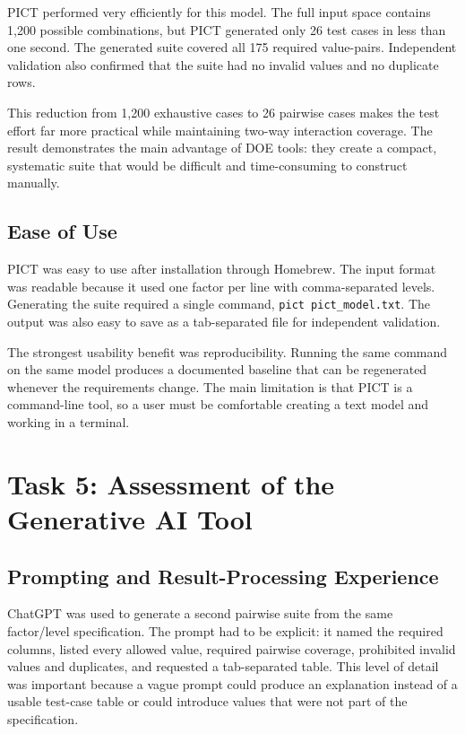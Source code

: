 \documentclass[11pt]{article}
\begin{document}
PICT performed very efficiently for this model. The full input space contains 1,200 possible combinations, but PICT generated only 26 test cases in less than one second. The generated suite covered all 175 required value-pairs. Independent validation also confirmed that the suite had no invalid values and no duplicate rows.

This reduction from 1,200 exhaustive cases to 26 pairwise cases makes the test effort far more practical while maintaining two-way interaction coverage. The result demonstrates the main advantage of DOE tools: they create a compact, systematic suite that would be difficult and time-consuming to construct manually.

\subsection{Ease of Use}

PICT was easy to use after installation through Homebrew. The input format was readable because it used one factor per line with comma-separated levels. Generating the suite required a single command, \texttt{pict pict\_model.txt}. The output was also easy to save as a tab-separated file for independent validation.

The strongest usability benefit was reproducibility. Running the same command on the same model produces a documented baseline that can be regenerated whenever the requirements change. The main limitation is that PICT is a command-line tool, so a user must be comfortable creating a text model and working in a terminal.

\section{Task 5: Assessment of the Generative AI Tool}

\subsection{Prompting and Result-Processing Experience}

ChatGPT was used to generate a second pairwise suite from the same factor/level specification. The prompt had to be explicit: it named the required columns, listed every allowed value, required pairwise coverage, prohibited invalid values and duplicates, and requested a tab-separated table. This level of detail was important because a vague prompt could produce an explanation instead of a usable test-case table or could introduce values that were not part of the specification.
\end{document}
